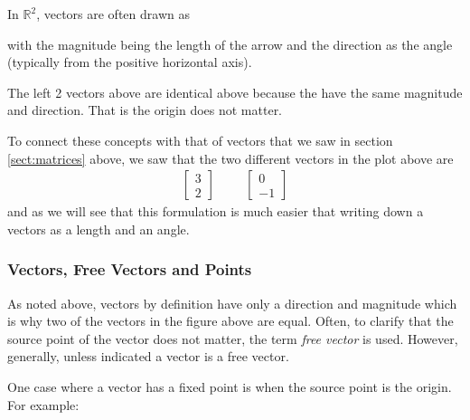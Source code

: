 In $\mathbb{R}^2$, vectors are often drawn as
%
\begin{center}
\end{center}
with the magnitude being the length of the arrow and the direction as the angle (typically from the positive horizontal axis).

The left 2 vectors above are identical above because the have the same magnitude and direction.  That is the origin does not matter.

To connect these concepts with that of vectors that we saw in section \ref{sect:matrices}  above, we saw that the two different vectors in the plot above are
%
\begin{align*}
\begin{bmatrix}
3 \\ 2
\end{bmatrix} &&& \begin{bmatrix}
0 \\ -1
\end{bmatrix}
\end{align*}
and as we will see that this formulation is much easier that writing down a vectors as a length and an angle.

\subsubsection{Vectors, Free Vectors and Points}

As noted above, vectors by definition have only a direction and magnitude which is why two of the vectors in the figure above are equal.  Often, to clarify that the source point of the vector does not matter, the term \emph{free vector} is used.   However, generally, unless indicated a vector is a free vector.

One case where a vector has a fixed point is when the source point is the origin.  For example:

\begin{center}
\end{center}

